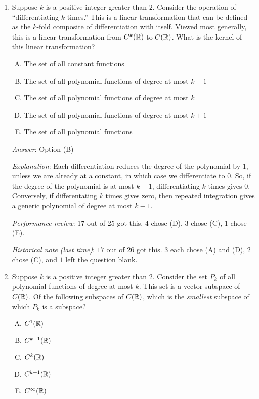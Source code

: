 \documentclass[10pt]{amsart}
\begin{document}
\begin{enumerate}
  {\em Historical note (last time)}: $11$ out of $26$ got this. $8$ chose (B),
  $4$ chose (C), $2$ chose (E), and $1$ left the question blank.

\item Suppose $k$ is a positive integer greater than $2$. Consider the
  operation of ``differentiating $k$ times.'' This is a linear
  transformation that can be defined as the $k$-fold composite of
  differentiation with itself. Viewed most generally, this is a linear
  transformation from $C^k(\mathbb{R})$ to $C(\mathbb{R})$. What is the kernel of this
  linear transformation?

  \begin{enumerate}[(A)]
  \item The set of all constant functions
  \item The set of all polynomial functions of degree at most $k - 1$
  \item The set of all polynomial functions of degree at most $k$
  \item The set of all polynomial functions of degree at most $k + 1$
  \item The set of all polynomial functions
  \end{enumerate}

  {\em Answer}: Option (B)

  {\em Explanation}: Each differentiation reduces the degree of the
  polynomial by $1$, unless we are already at a constant, in which
  case we differentiate to $0$. So, if the degree of the polynomial is
  at most $k - 1$, differentiating $k$ times gives $0$. Conversely, if
  differentating $k$ times gives zero, then repeated integration gives
  a generic polynomial of degree at most $k - 1$.

  {\em Performance review}: 17 out of 25 got this. 4 chose (D), 3
  chose (C), 1 chose (E).

  {\em Historical note (last time)}: $17$ out of $26$ got this. $3$ each chose
  (A) and (D), $2$ chose (C), and $1$ left the question blank.

\item Suppose $k$ is a positive integer greater than $2$. Consider the
  set $P_k$ of all polynomial functions of degree at most $k$. This
  set is a vector subspace of $C(\mathbb{R})$. Of the following subspaces of
  $C(\mathbb{R})$, which is the {\em smallest} subspace of which $P_k$ is a
  subspace?

  \begin{enumerate}[(A)]
  \item $C^1(\mathbb{R})$
  \item $C^{k-1}(\mathbb{R})$
  \item $C^k(\mathbb{R})$
  \item $C^{k+1}(\mathbb{R})$
  \item $C^\infty(\mathbb{R})$
  \end{enumerate}


\end{enumerate}
\end{document}
